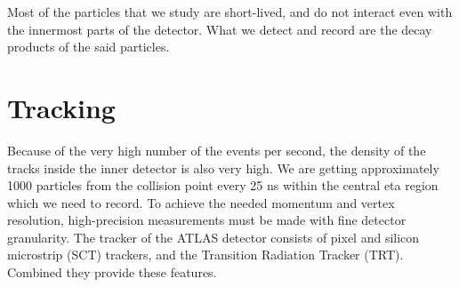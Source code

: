 Most of the particles that we study are short-lived, and do not interact even with the innermost parts of the detector. What we detect and record are the decay products of the said particles.

\section{Tracking}
\label{sec:ATLAS_tracker}

Because of the very high number of the events per second, the density of the tracks inside the inner detector is also very high. We are getting approximately 1000 particles
from the collision point every 25 ns within the central eta region which we need to record. To achieve the needed momentum and vertex resolution, high-precision measurements must be made with fine detector granularity. The tracker of the ATLAS detector consists of pixel and silicon microstrip (SCT) trackers, and the Transition Radiation Tracker (TRT). Combined they provide these features.

\begin{figure}
\end{figure}

